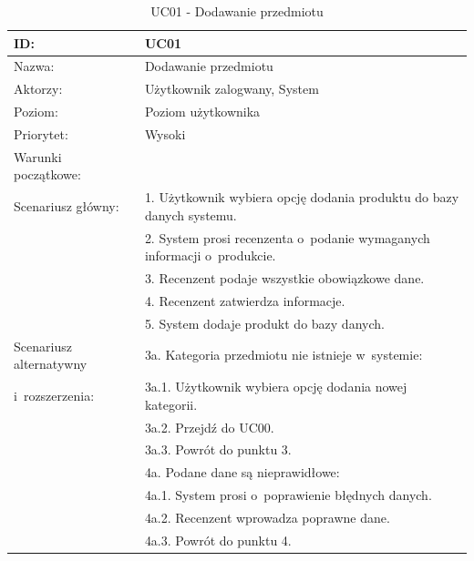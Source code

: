 \begin{table}[H]
    \begin{tabular}{|p{5cm}|p{9cm}|}\hline
    ID: & UC01 \\ \hline
    Nazwa: & Dodawanie przedmiotu \\\hline
    Aktorzy: & Użytkownik zalogwany, System \\\hline
    Poziom: & Poziom użytkownika  \\\hline
    Priorytet: & Wysoki \\\hline
    Warunki początkowe: & ~ \\\hline
    Scenariusz główny: & 1. Użytkownik wybiera opcję dodania produktu do bazy danych systemu. \\
    ~ & 2. System prosi recenzenta o~podanie wymaganych informacji o~produkcie. \\
    ~ & 3. Recenzent podaje wszystkie obowiązkowe dane. \\
    ~ & 4. Recenzent zatwierdza informacje. \\
    ~ & 5. System dodaje produkt do bazy danych. \\\hline
    Scenariusz alternatywny & 3a. Kategoria przedmiotu nie istnieje w~systemie: \\
    i~rozszerzenia: & 3a.1. Użytkownik wybiera opcję dodania nowej kategorii. \\
    ~ & 3a.2. Przejdź do UC00. \\
    ~ & 3a.3. Powrót do punktu 3. \\
    ~ & 4a. Podane dane są nieprawidłowe: \\
    ~ & 4a.1. System prosi o~poprawienie błędnych danych. \\
    ~ & 4a.2. Recenzent wprowadza poprawne dane. \\
    ~ & 4a.3. Powrót do punktu 4. \\
    \hline\end{tabular}
	\caption{UC01 - Dodawanie przedmiotu}
\end{table}


